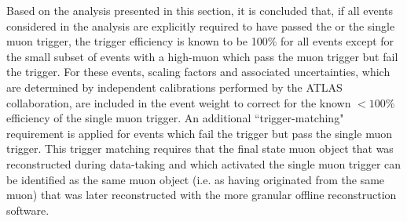 Based on the analysis presented in this section, it is concluded that, if all events considered in the analysis are explicitly required to have passed the \met or the single muon trigger, the trigger efficiency is known to be 100\% for all events except for the small subset of events with a high-\pt muon which pass the muon trigger but fail the \met trigger. For these events, scaling factors and associated uncertainties, which are determined by independent calibrations performed by the ATLAS collaboration, are included in the event weight to correct for the known \(<100\%\) efficiency of the single muon trigger. An additional ``trigger-matching" requirement is applied for events which fail the \met trigger but pass the single muon trigger. This trigger matching requires that the final state muon object that was reconstructed during data-taking and which activated the single muon trigger can be identified as the same muon object (i.e. as having originated from the same muon) that was later reconstructed with the more granular offline reconstruction software. 
